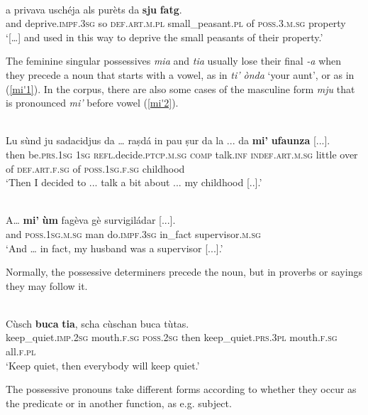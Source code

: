 \ea
\label{}
\\
\gll   […] a privava uschéja als purèts da \textbf{sju} \textbf{fatg}.\\
     {} and deprive.\textsc{impf.3sg} so \textsc{def.art.m.pl} small\_peasant.\textsc{pl} of \textsc{poss.3.m.sg} property\\
\glt `[…] and used in this way to deprive the small peasants of their property.'
\z

The feminine singular possessives \textit{mia} and \textit{tia} usually lose their final \textit{-a} when they precede a noun that starts with a vowel, as in \textit{ti' ònda} `your aunt', or as in (\ref{mi'1}). In the corpus, there are also some cases of the masculine form \textit{mju} that is pronounced \textit{mi'} before vowel (\ref{mi'2}).

\ea
\label{mi'1}
\\
\gll Lu sùnd ju sadacidjus da … raṣdá in pau ṣur da la ... da \textbf{mi’} \textbf{ufaunza} [...]. \\
then  be.\textsc{prs.1sg} \textsc{1sg}  \textsc{refl}.decide.\textsc{ptcp.m.sg} \textsc{comp} {} talk.\textsc{inf} \textsc{indef.art.m.sg} little over of  \textsc{def.art.f.sg} {} of  \textsc{poss.1sg.f.sg} childhood\\
\glt `Then I decided to ... talk a bit about ... my childhood [..].'
\z

\ea
\label{mi'2}
\\
\gll  A… \textbf{mi'} \textbf{ùm} fagèva gè survigiládar [...].  \\
and \textsc{poss.1sg.m.sg} man do.\textsc{impf.3sg} in\_fact supervisor.\textsc{m.sg}\\
\glt `And … in fact, my husband was a supervisor [...].'
\z

Normally, the possessive determiners precede the noun, but in proverbs or sayings they may follow it.

\ea\label{}
\\
\gll Cùsch \textbf{buca} \textbf{tia}, scha cùschan buca tùtas.\\
keep\_quiet.\textsc{imp.2sg} mouth.\textsc{f.sg} \textsc{poss.2sg} then keep\_quiet.\textsc{prs.3pl} mouth.\textsc{f.sg} all.\textsc{f.pl}\\
\glt `Keep quiet, then everybody will keep quiet.'
\z

The possessive pronouns take different forms according to whether they occur as the predicate or in another function, as e.g. subject.

